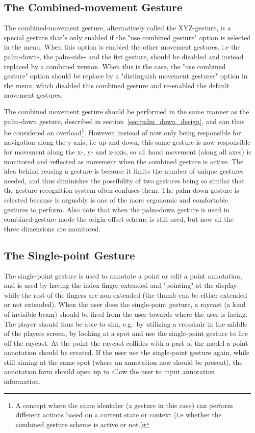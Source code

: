 \subsection{The Combined-movement Gesture}
\label{sec:combined-movement}
The combined-movement gesture, alternatively called the XYZ-gesture, is a special gesture that's only enabled if the "use combined gesture" option is selected in the menu.
When this option is enabled the other movement gestures, i.e the palm-down-, the palm-side- and the fist gesture, should be disabled and instead replaced by a combined version. 
When this is the case, the "use combined gesture" option should be replace by a "distinguish movement gestures" option in the menu, 
which disabled this combined gesture and re-enabled the default movement gestures. 

The combined movement gesture should be performed in the same manner as the palm-down gesture, described in section~\ref{sec:palm_down_design}, 
and can thus be considered an overload\footnote{A concept where the same identifier (a gesture in this case) can perform different actions based on a current state or context (i.e whether the combined gesture scheme is active or not.)}.
However, instead of now only being responsible for navigation along the y-axis, i.e up and down, this same gesture is now responsible for movement along the x-, y- and z-axis, so
all hand movement (along all axes) is monitored and reflected as movement when the combined gesture is active.
The idea behind reusing a gesture is because it limits the number of unique gestures needed, and thus diminishes the possibility of two gestures being so similar 
that the gesture recognition system often confuses them. The palm-down gesture is selected because is arguably is one of the more ergonomic and comfortable gestures to perform. 
Also note that when the palm-down gesture is used in combined-gesture mode the origin-offset scheme is still used, but now all the three dimensions are monitored. 

\subsection{The Single-point Gesture}
The single-point gesture is used to annotate a point or edit a point annotation, and is used by having the index finger extended and "pointing" at the display while the 
rest of the fingers are non-extended (the thumb can be either extended or not extended). 
When the user does the single-point gesture, a raycast (a kind of invisible beam) should be fired from the user towards where the user is facing.
The player should thus be able to aim, e.g.~by utilizing a crosshair in the middle of the players screen, by looking at a spot and use the single-point gesture to fire off 
the raycast. At the point the raycast collides with a part of the model a point annotation should be created. If the user use the single-point gesture again, while
still aiming at the same spot (where an annotation now should be present), the annotation form should open up to allow the user to input annotation information. 

